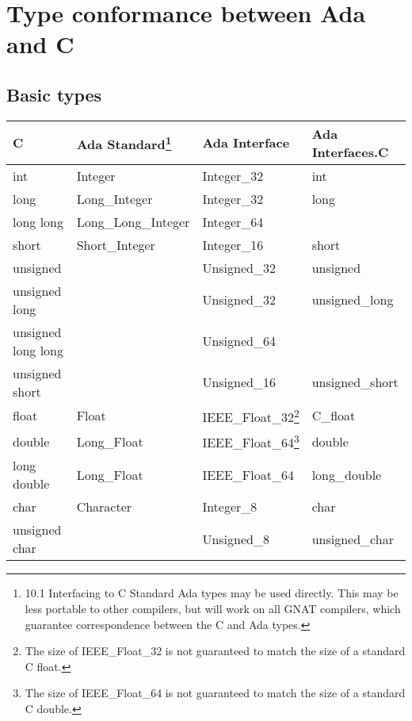 \section{Type conformance between Ada and C}
\subsection{Basic types}
\begin{tabular}{| p{2cm} | l | l | l |}
\hline
C & Ada Standard\footnote{10.1 Interfacing to C
Standard Ada types may be used directly. This may be less portable to other compilers, but will work on all GNAT compilers, which guarantee correspondence between the C and Ada types.} & Ada Interface & Ada Interfaces.C \\ \hline
int &	Integer &	Integer_32 &	int \\ \hline
long &	Long_Integer &	Integer_32 &	long \\ \hline
long long &	Long_Long_Integer &	Integer_64 &	 \\ \hline
short	& Short_Integer &	Integer_16 &	short\\ \hline
unsigned&	&	Unsigned_32 &	unsigned\\ \hline
unsigned long	& &	Unsigned_32 &	unsigned_long\\ \hline
unsigned long long &	&	Unsigned_64	& \\ \hline
unsigned short	 & &	Unsigned_16 &	unsigned_short \\ \hline
float	& Float	 & IEEE_Float_32\footnote{The size of IEEE_Float_32 is not guaranteed to match the size of a standard C float.} &	C_float \\ \hline
double	& Long_Float &	IEEE_Float_64\footnote{The size of IEEE_Float_64 is not guaranteed to match the size of a standard C double.} &	double \\ \hline
long double&	Long_Float &	IEEE_Float_64 &	long_double \\ \hline
char	&Character &	Integer_8 &	char \\ \hline
unsigned char &  &		Unsigned_8&	unsigned_char\\ \hline
\end{tabular}
